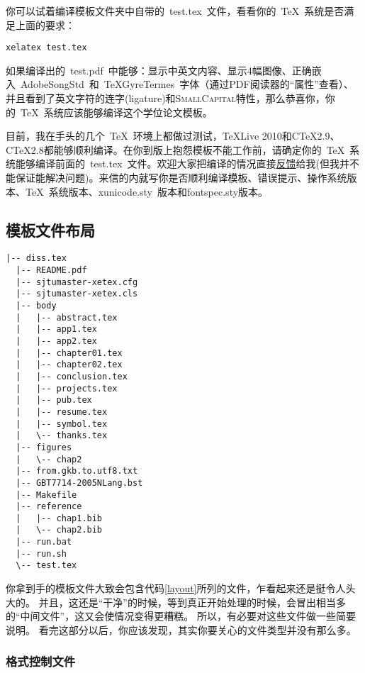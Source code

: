 你可以试着编译模板文件夹中自带的~test.tex~文件，看看你的~\TeX~系统是否满足上面的要求：

\begin{verbatim}
xelatex test.tex
\end{verbatim}

如果编译出的~test.pdf~中能够：显示中英文内容、显示4幅图像、正确嵌入~AdobeSongStd~和~TeXGyreTermes~字体（通过PDF阅读器的“属性”查看）、并且看到了英文字符的连字(ligature)和\textsc{SmallCapital}特性，那么恭喜你，你的~\TeX~系统应该能够编译这个学位论文模板。

目前，我在手头的几个~\TeX~环境上都做过测试，TeXLive 2010和C\TeX 2.9、C\TeX 2.8都能够顺利编译。在你到版上抱怨模板不能工作前，请确定你的~\TeX~系统能够编译前面的~test.tex~文件。欢迎大家把编译的情况直接\href{mailto:wei.jianwen@gmail.com}{反馈}给我(但我并不能保证能解决问题)。来信的内就写你是否顺利编译模板、错误提示、操作系统版本、\TeX~系统版本、xunicode.sty~版本和fontspec.sty版本。
 
\subsection{模板文件布局}
\label{sec:layout}

\begin{lstlisting}[basicstyle=\small\ttfamily,caption={模板文件布局},label=layout,float,numbers=none]
  |-- diss.tex
  |-- README.pdf
  |-- sjtumaster-xetex.cfg
  |-- sjtumaster-xetex.cls
  |-- body
  |   |-- abstract.tex
  |   |-- app1.tex
  |   |-- app2.tex
  |   |-- chapter01.tex
  |   |-- chapter02.tex
  |   |-- conclusion.tex
  |   |-- projects.tex
  |   |-- pub.tex
  |   |-- resume.tex
  |   |-- symbol.tex
  |   \-- thanks.tex
  |-- figures
  |   \-- chap2
  |-- from.gkb.to.utf8.txt
  |-- GBT7714-2005NLang.bst
  |-- Makefile
  |-- reference
  |   |-- chap1.bib
  |   \-- chap2.bib
  |-- run.bat
  |-- run.sh
  \-- test.tex
\end{lstlisting}

你拿到手的模板文件大致会包含代码\ref{layout}所列的文件，乍看起来还是挺令人头大的。
并且，这还是“干净”的时候，等到真正开始处理的时候，会冒出相当多的“中间文件”，这又会使情况变得更糟糕。
所以，有必要对这些文件做一些简要说明。
看完这部分以后，你应该发现，其实你要关心的文件类型并没有那么多。

\subsubsection{格式控制文件}
\label{sec:format}

